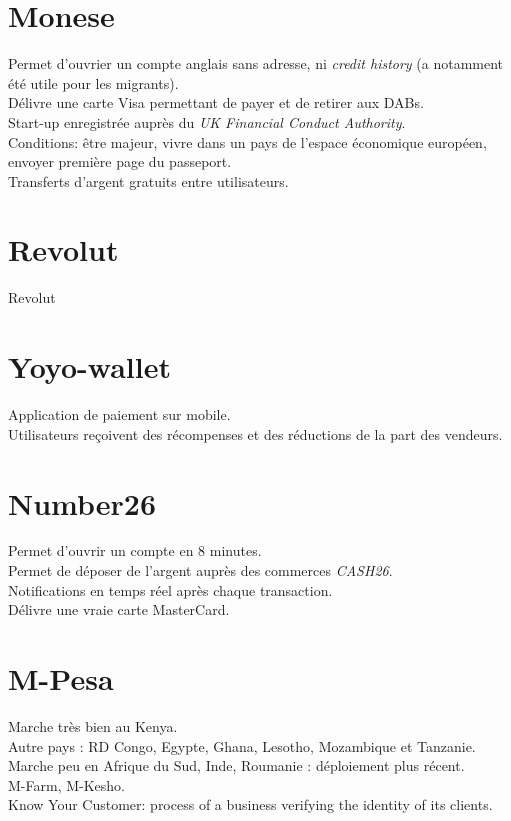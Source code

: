 \documentclass{report}
\begin{document}
\section{Monese}
Permet d'ouvrier un compte anglais sans adresse, ni \emph{credit history} (a notamment été utile pour les migrants). \\
Délivre une carte Visa permettant de payer et de retirer aux DABs. \\
Start-up enregistrée auprès du \emph{UK Financial Conduct Authority}. \\
Conditions: être majeur, vivre dans un pays de l'espace économique européen, envoyer première page du passeport. \\
Transferts d'argent gratuits entre utilisateurs.
\section{Revolut}
Revolut
\section{Yoyo-wallet}
Application de paiement sur mobile. \\
Utilisateurs reçoivent des récompenses et des réductions de la part des vendeurs.
\section{Number26}
Permet d'ouvrir un compte en 8 minutes. \\
Permet de déposer de l'argent auprès des commerces \emph{CASH26}. \\
Notifications en temps réel après chaque transaction. \\
Délivre une vraie carte MasterCard.
\section{M-Pesa}
Marche très bien au Kenya. \\
Autre pays : RD Congo, Egypte, Ghana, Lesotho, Mozambique et Tanzanie. \\
Marche peu en Afrique du Sud, Inde, Roumanie : déploiement plus récent. \\
M-Farm, M-Kesho. \\
Know Your Customer:  process of a business verifying the identity of its clients.
\end{document}
